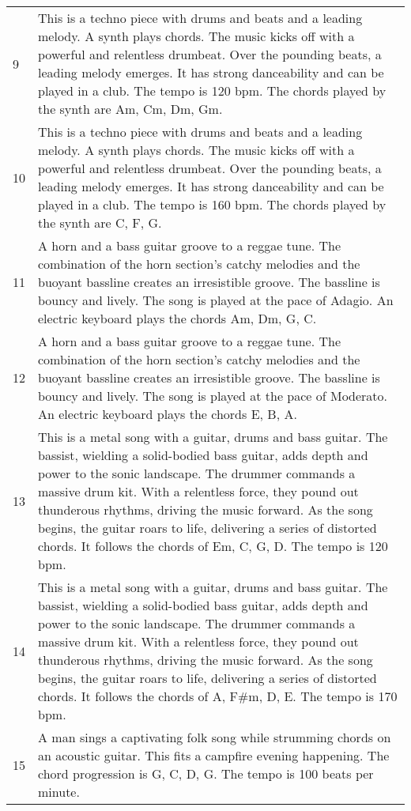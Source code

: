 \documentclass[11pt]{article}
\begin{document}
\begin{table*}[h]
\begin{tabular}{p{0.4cm} p{15cm}}
9& This is a techno piece with drums and beats and a leading melody. A synth plays chords. The music kicks off with a powerful and relentless drumbeat. Over the pounding beats, a leading melody emerges. It has strong danceability and can be played in a club. The tempo is 120 bpm. The chords played by the synth are Am, Cm, Dm, Gm.    \\
10& This is a techno piece with drums and beats and a leading melody. A synth plays chords. The music kicks off with a powerful and relentless drumbeat. Over the pounding beats, a leading melody emerges. It has strong danceability and can be played in a club. The tempo is 160 bpm. The chords played by the synth are C, F, G.          \\
11& A horn and a bass guitar groove to a reggae tune. The combination of the horn section's catchy melodies and the buoyant bassline creates an irresistible groove. The bassline is bouncy and lively. The song is played at the pace of Adagio. An electric keyboard plays the chords Am, Dm, G, C.                    \\
12& A horn and a bass guitar groove to a reggae tune. The combination of the horn section's catchy melodies and the buoyant bassline creates an irresistible groove. The bassline is bouncy and lively. The song is played at the pace of Moderato. An electric keyboard plays the chords E, B, A.                                                \\
13& This is a metal song with a guitar, drums and bass guitar. The bassist, wielding a solid-bodied bass guitar, adds depth and power to the sonic landscape. The drummer commands a massive drum kit. With a relentless force, they pound out thunderous rhythms, driving the music forward. As the song begins, the guitar roars to life, delivering a series of distorted chords. It follows the chords of Em, C, G, D. The tempo is 120 bpm.   \\
14& This is a metal song with a guitar, drums and bass guitar. The bassist, wielding a solid-bodied bass guitar, adds depth and power to the sonic landscape. The drummer commands a massive drum kit. With a relentless force, they pound out thunderous rhythms, driving the music forward. As the song begins, the guitar roars to life, delivering a series of distorted chords. It follows the chords of A, F\#m, D, E. The tempo is 170 bpm.  \\
15& A man sings a captivating folk song while strumming chords on an acoustic guitar. This fits a campfire evening happening. The chord progression is G, C, D, G. The tempo is 100 beats per minute.                                          \\

\end{tabular}
\end{table*}
\end{document}
